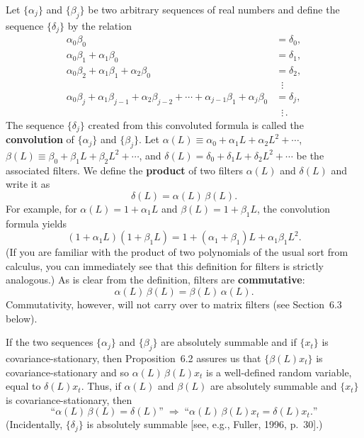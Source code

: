 Let $\{\alpha_j\}$ and $\{\beta_j\}$ be two arbitrary sequences of real numbers and define the sequence
$\{\delta_j\}$ by the relation
\begin{equation}
\begin{aligned}
  \alpha_0 \beta_0 &= \delta_0, \\
  \alpha_0 \beta_1 + \alpha_1 \beta_0 &= \delta_1, \\
  \alpha_0 \beta_2 + \alpha_1 \beta_1 + \alpha_2 \beta_0 &= \delta_2, \\
  &\;\;\vdots \\
  \alpha_0 \beta_j + \alpha_1 \beta_{j-1} + \alpha_2 \beta_{j-2} + \cdots + \alpha_{j-1} \beta_1 + \alpha_j \beta_0 &= \delta_j, \\
  &\;\;\vdots\,.
\end{aligned}
\label{eq:6.1.12}
\end{equation}
The sequence $\{\delta_j\}$ created from this convoluted formula is called the \textbf{convolution}
of $\{\alpha_j\}$ and $\{\beta_j\}$. Let $\alpha(L) \equiv \alpha_0 + \alpha_1 L + \alpha_2 L^2 + \cdots$,
$\beta(L) \equiv \beta_0 + \beta_1 L + \beta_2 L^2 + \cdots$,
and $\delta(L) = \delta_0 + \delta_1 L + \delta_2 L^2 + \cdots$ be the associated filters. We define the
\textbf{product} of two filters $\alpha(L)$ and $\delta(L)$ and write it as
\[
  \delta(L) = \alpha(L)\,\beta(L).
\]
For example, for $\alpha(L) = 1 + \alpha_1 L$ and $\beta(L) = 1 + \beta_1 L$, the convolution formula
yields
\[
  (1 + \alpha_1 L)(1 + \beta_1 L) = 1 + (\alpha_1 + \beta_1) L + \alpha_1 \beta_1 L^2.
\]
(If you are familiar with the product of two polynomials of the usual sort from calculus,
you can immediately see that this definition for filters is strictly analogous.)
As is clear from the definition, filters are \textbf{commutative}:
\[
  \alpha(L)\,\beta(L) = \beta(L)\,\alpha(L).
\]
Commutativity, however, will not carry over to matrix filters (see Section~6.3
below).

If the two sequences $\{\alpha_j\}$ and $\{\beta_j\}$ are absolutely summable and if $\{x_t\}$ is
covariance-stationary, then Proposition~6.2 assures us that $\{\beta(L) x_t\}$ is covariance-stationary and so $\alpha(L)\,\beta(L) x_t$ is a well-defined random variable, equal to $\delta(L) x_t$.
Thus, if $\alpha(L)$ and $\beta(L)$ are absolutely summable and $\{x_t\}$ is covariance-stationary,
then
\begin{equation}
  \text{``}\alpha(L)\,\beta(L) = \delta(L)\text{''} \;\Rightarrow\;
  \text{``}\alpha(L)\,\beta(L) x_t = \delta(L) x_t.\text{''}
  \label{eq:6.1.13}
\end{equation}
(Incidentally, $\{\delta_j\}$ is absolutely summable [see, e.g., Fuller, 1996, p.~30].)


